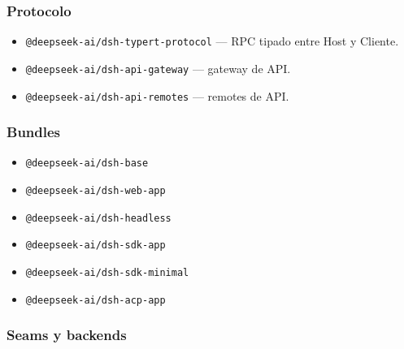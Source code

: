 \documentclass[11pt,a4paper]{article}
\begin{document}
\subsubsection*{Protocolo}


\begin{itemize}[leftmargin=*,topsep=2pt,itemsep=1pt]
  \item \texttt{@deepseek-ai/dsh-typert-protocol} — RPC tipado entre Host y Cliente.
  \item \texttt{@deepseek-ai/dsh-api-gateway} — gateway de API.
  \item \texttt{@deepseek-ai/dsh-api-remotes} — remotes de API.
\end{itemize}


\subsubsection*{Bundles}


\begin{itemize}[leftmargin=*,topsep=2pt,itemsep=1pt]
  \item \texttt{@deepseek-ai/dsh-base}
  \item \texttt{@deepseek-ai/dsh-web-app}
  \item \texttt{@deepseek-ai/dsh-headless}
  \item \texttt{@deepseek-ai/dsh-sdk-app}
  \item \texttt{@deepseek-ai/dsh-sdk-minimal}
  \item \texttt{@deepseek-ai/dsh-acp-app}
\end{itemize}


\subsubsection*{Seams y backends}
\end{document}
